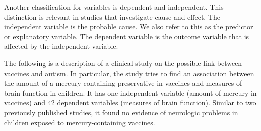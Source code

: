 \documentclass[11pt]{book}\usepackage[]{graphicx}\usepackage[]{color}
\begin{document}
Another classification for variables is dependent and independent. This distinction is relevant in studies that investigate cause and effect.  The independent variable is the probable cause.  We also refer to this as the predictor or explanatory variable.  The dependent variable is the outcome variable that is affected by the independent variable.


The following is a description of a clinical study on the possible link between vaccines and autism.   In particular, the study tries to find an association between the amount of a mercury-containing preservative in vaccines and measures of brain function in children.   It has one independent variable (amount of mercury in vaccines) and 42 dependent variables (measures of brain function).  Similar to two previously published studies, it found no evidence of neurologic problems in children exposed to mercury-containing vaccines. \citep{thompson2007}
\end{document}
